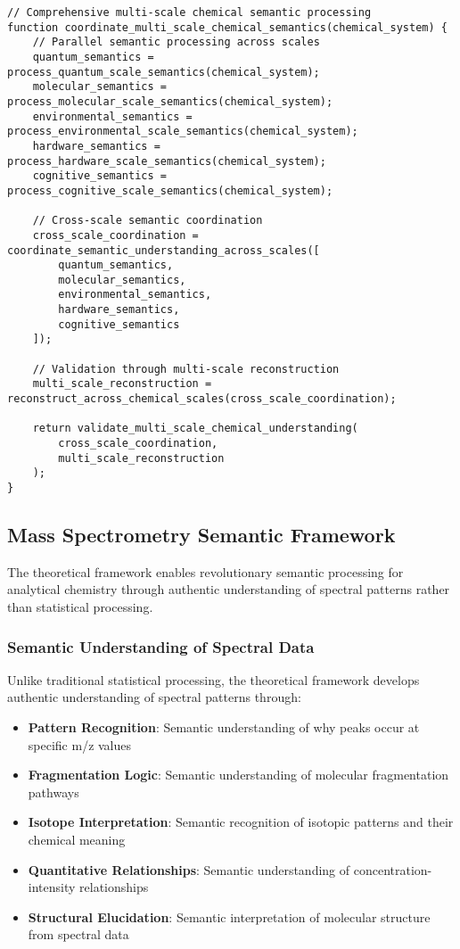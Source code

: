 \documentclass[12pt,a4paper,twoside]{article}
\begin{document}
\begin{lstlisting}[caption=Multi-Scale Chemical Semantic Coordination]
// Comprehensive multi-scale chemical semantic processing
function coordinate_multi_scale_chemical_semantics(chemical_system) {
    // Parallel semantic processing across scales
    quantum_semantics = process_quantum_scale_semantics(chemical_system);
    molecular_semantics = process_molecular_scale_semantics(chemical_system);
    environmental_semantics = process_environmental_scale_semantics(chemical_system);
    hardware_semantics = process_hardware_scale_semantics(chemical_system);
    cognitive_semantics = process_cognitive_scale_semantics(chemical_system);

    // Cross-scale semantic coordination
    cross_scale_coordination = coordinate_semantic_understanding_across_scales([
        quantum_semantics,
        molecular_semantics,
        environmental_semantics,
        hardware_semantics,
        cognitive_semantics
    ]);

    // Validation through multi-scale reconstruction
    multi_scale_reconstruction = reconstruct_across_chemical_scales(cross_scale_coordination);

    return validate_multi_scale_chemical_understanding(
        cross_scale_coordination,
        multi_scale_reconstruction
    );
}
\end{lstlisting}

\subsection{Mass Spectrometry Semantic Framework}

The theoretical framework enables revolutionary semantic processing for analytical chemistry through authentic understanding of spectral patterns rather than statistical processing.

\subsubsection{Semantic Understanding of Spectral Data}

Unlike traditional statistical processing, the theoretical framework develops authentic understanding of spectral patterns through:

\begin{itemize}
\item \textbf{Pattern Recognition}: Semantic understanding of why peaks occur at specific m/z values
\item \textbf{Fragmentation Logic}: Semantic understanding of molecular fragmentation pathways
\item \textbf{Isotope Interpretation}: Semantic recognition of isotopic patterns and their chemical meaning
\item \textbf{Quantitative Relationships}: Semantic understanding of concentration-intensity relationships
\item \textbf{Structural Elucidation}: Semantic interpretation of molecular structure from spectral data
\end{itemize}
\end{document}
